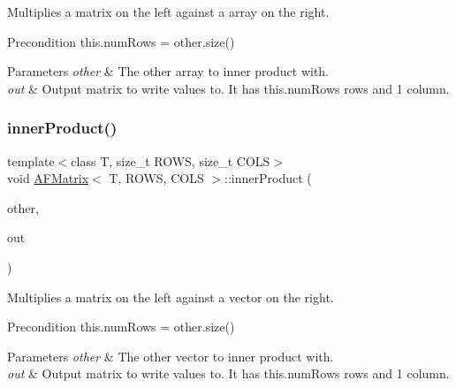 Multiplies a matrix on the left against a array on the right. \begin{DoxyPrecond}{Precondition}
this.\+num\+Rows = other.\+size() 
\end{DoxyPrecond}

\begin{DoxyParams}{Parameters}
{\em other} & The other array to inner product with. \\
\hline
{\em out} & Output matrix to write values to. It has this.\+num\+Rows rows and 1 column. \\
\hline
\end{DoxyParams}
\mbox{\label{class_a_f_matrix_ad2763218bc42414ca32cdecba3b88be2}} 
\subsubsection{\texorpdfstring{inner\+Product()}{innerProduct()}\hspace{0.1cm}{\footnotesize\ttfamily [3/3]}}
{\footnotesize\ttfamily template$<$class T, size\+\_\+t R\+O\+WS, size\+\_\+t C\+O\+LS$>$ \\
void \hyperlink{class_a_f_matrix}{A\+F\+Matrix}$<$ T, R\+O\+WS, C\+O\+LS $>$\+::inner\+Product (\begin{DoxyParamCaption}\item[{array$<$ T, R\+O\+WS $>$ $\ast$}]{other,  }\item[{array$<$ T, C\+O\+LS $>$ $\ast$}]{out }\end{DoxyParamCaption})\hspace{0.3cm}{\ttfamily [inline]}}

Multiplies a matrix on the left against a vector on the right. \begin{DoxyPrecond}{Precondition}
this.\+num\+Rows = other.\+size() 
\end{DoxyPrecond}

\begin{DoxyParams}{Parameters}
{\em other} & The other vector to inner product with. \\
\hline
{\em out} & Output matrix to write values to. It has this.\+num\+Rows rows and 1 column. \\
\hline
\end{DoxyParams}
\mbox{\label{class_a_f_matrix_a905b58769fceaf03972f7ea179ea3934}} 

